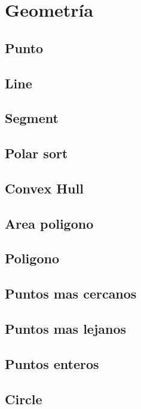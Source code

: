 \newpage
\section{Geometr\'ia}

\subsection{Punto}


\subsection{Line}


\subsection{Segment}


\subsection{Polar sort}


\subsection{Convex Hull}


\subsection{Area poligono}


\subsection{Poligono}


\subsection{Puntos mas cercanos}


\subsection{Puntos mas lejanos}


\subsection{Puntos enteros}


\subsection{Circle}


\newpage
